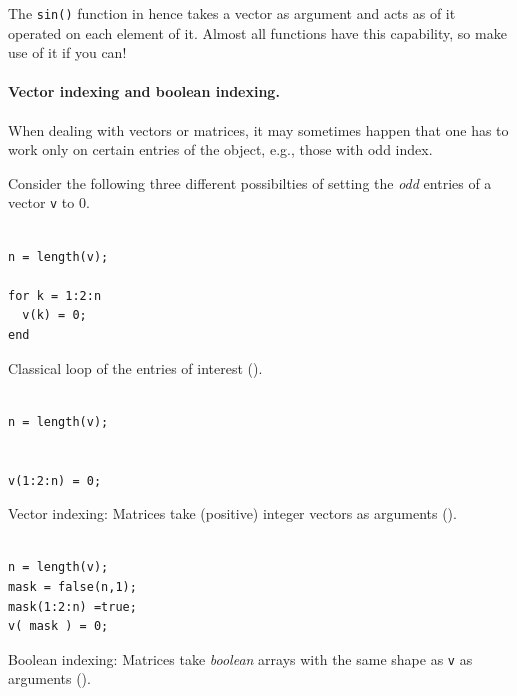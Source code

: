 The \lstinline!sin()! function in \matlab{} hence takes a vector as argument
and acts as of it operated on each element of it. Almost all \matlab{}
functions have this capability, so make use of it if you can!


\paragraph{Vector indexing and boolean indexing.}\label{sec:logicalIndexing}
When dealing with vectors or matrices, it may sometimes happen that one has to
work only on certain entries of the object, e.g., those with odd index.

Consider the following three different possibilties of setting the \emph{odd}
entries of a vector \lstinline!v! to $0$.

\hfill
\begin{minipage}[t]{.29\textwidth}
\begin{lstlisting}[framerule=1pt,rulecolor=\color{goodgreen}]
% [...] create v

n = length(v);

for k = 1:2:n
  v(k) = 0;
end
\end{lstlisting}
Classical loop of the entries of interest ().
\end{minipage}
\hfill
\begin{minipage}[t]{.29\textwidth}
\begin{lstlisting}[framerule=1pt,rulecolor=\color{mediocre}]
% [...] create v

n = length(v);


v(1:2:n) = 0;

\end{lstlisting}
Vector indexing: Matrices take (positive) integer vectors as arguments
().
\end{minipage}
\hfill
\begin{minipage}[t]{.29\textwidth}
\begin{lstlisting}[framerule=1pt,rulecolor=\color{badred}]
% [...] create v

n = length(v);
mask = false(n,1);
mask(1:2:n) =true;
v( mask ) = 0;

\end{lstlisting}
Boolean indexing: Matrices take \emph{boolean} arrays\footnotemark{} with the
same shape as \lstinline!v! as arguments ().
\end{minipage}
\hfill
{}

